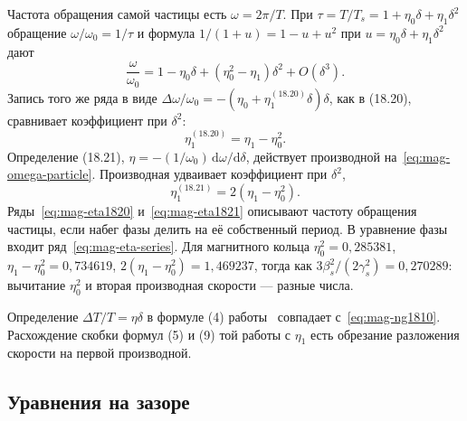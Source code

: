 \documentclass[aps,pra,preprint,a4paper,amsmath,amssymb,longbibliography]{revtex4-2}
\begin{document}
Частота обращения самой частицы есть $\omega=2\pi/T$. При $\tau=T/T_s=1+\eta_0\delta+\eta_1\delta^2$ обращение $\omega/\omega_0=1/\tau$ и формула $1/(1+u)=1-u+u^2$ при $u=\eta_0\delta+\eta_1\delta^2$ дают
\begin{equation}
\label{eq:mag-omega-particle}
\frac{\omega}{\omega_0}
=1-\eta_0\delta+(\eta_0^2-\eta_1)\delta^2+O(\delta^3).
\end{equation}
Запись того же ряда в виде $\Delta\omega/\omega_0=-(\eta_0+\eta_1^{(18.20)}\delta)\delta$, как в (18.20), сравнивает коэффициент при $\delta^2$:
\begin{equation}
\label{eq:mag-eta1820}
\eta_1^{(18.20)}=\eta_1-\eta_0^2.
\end{equation}
Определение (18.21), $\eta=-(1/\omega_0)\,\mathrm{d}\omega/\mathrm{d}\delta$, действует производной на~\eqref{eq:mag-omega-particle}. Производная удваивает коэффициент при $\delta^2$,
\begin{equation}
\label{eq:mag-eta1821}
\eta_1^{(18.21)}=2(\eta_1-\eta_0^2).
\end{equation}
Ряды~\eqref{eq:mag-eta1820} и~\eqref{eq:mag-eta1821} описывают частоту обращения частицы, если набег фазы делить на её собственный период. В уравнение фазы входит ряд~\eqref{eq:mag-eta-series}. Для магнитного кольца $\eta_0^2=0{,}285381$, $\eta_1-\eta_0^2=0{,}734619$, $2(\eta_1-\eta_0^2)=1{,}469237$, тогда как $3\beta_s^2/(2\gamma_s^2)=0{,}270289$: вычитание $\eta_0^2$ и вторая производная скорости --- разные числа.

Определение $\Delta T/T=\eta\delta$ в формуле (4) работы~\cite{Senichev2013} совпадает с~\eqref{eq:mag-ng1810}. Расхождение скобки формул (5) и (9) той работы с $\eta_1$ есть обрезание разложения скорости на первой производной.

\subsection{Уравнения на зазоре}
\label{sec:gap}
\end{document}
